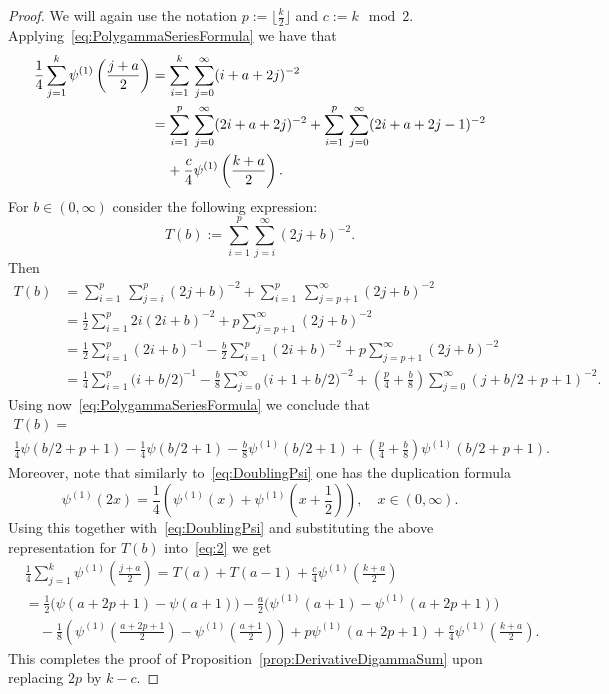 \documentclass[10pt]{amsart}
\theoremstyle{definition}\newtheorem{defi}[theo]{Definition}\newtheorem{rema}[theo]{Remark}\newtheorem{exam}[theo]{Example}\newtheorem{exem}[theo]{Example}\newtheorem{nota}[theo]{Notation}
\begin{document}
\begin{proof}
We will again use the notation $p:=\lfloor\frac{k}{2}\rfloor$ and $c:= k\mod 2$. Applying~\eqref{eq:PolygammaSeriesFormula} we have that
\begin{equation}\label{eq:2}
\begin{aligned}
\frac14\sum\limits_{j=1}^k\psi^{(1)}\left(\frac{j+a}{2}\right)&=\sum\limits_{i=1}^k\,\sum\limits_{j=0}^{\infty}(i+a+2j)^{-2}\\
&=\sum\limits_{i=1}^p\,\sum\limits_{j=0}^{\infty}(2i+a+2j)^{-2}+\sum\limits_{i=1}^p\,\sum\limits_{j=0}^{\infty}(2i+a+2j-1)^{-2}\\
&\mkern20mu +\frac{c}{4}\psi^{(1)}\left(\frac{k+a}{2}\right).
\end{aligned}
\end{equation}
For $b\in(0,\infty)$ consider the following expression:
\[
T(b):=\sum\limits_{i=1}^p\sum\limits_{j=i}^{\infty}(2j+b)^{-2}.
\]
Then
\begin{align*}
T(b)&=\sum\limits_{i=1}^p\,\sum\limits_{j=i}^{p}(2j+b)^{-2}+\sum\limits_{i=1}^p\,\sum\limits_{j=p+1}^{\infty}(2j+b)^{-2}\\
&=\frac12\sum\limits_{i=1}^p 2i(2i+b)^{-2}+p\sum\limits_{j=p+1}^{\infty}(2j+b)^{-2}\\
&=\frac12\sum\limits_{i=1}^p(2i+b)^{-1}-\frac{b}{2}\sum\limits_{i=1}^p(2i+b)^{-2}+p\sum\limits_{j=p+1}^{\infty}(2j+b)^{-2}\\
&=\frac14\sum\limits_{i=1}^p\big(i+b/2\big)^{-1}-\frac{b}{8}\sum\limits_{j=0}^\infty\big(i+1+b/2\big)^{-2}+\left(\frac{p}{4}+\frac{b}{8}\right)\sum\limits_{j=0}^{\infty}\left(j+b/2+p+1\right)^{-2}.
\end{align*}
Using now~\eqref{eq:PolygammaSeriesFormula} we conclude that
\begin{multline*}
T(b) =\\
\frac{1}{4}\psi(b/2+p+1)-\frac{1}{4}\psi(b/2+1)-\frac{b}{8}\psi^{(1)}(b/2+1)+\left(\frac{p}{4}+\frac{b}{8}\right)\psi^{(1)}\left(b/2+p+1\right).
\end{multline*}
Moreover, note that similarly to~\eqref{eq:DoublingPsi} one has the duplication formula
\[
\psi^{(1)}(2x) = \frac{1}{4}\left(\psi^{(1)}(x)+\psi^{(1)}\left(x+\frac{1}{2}\right)\right),\quad x\in(0,\infty).
\]
Using this together with~\eqref{eq:DoublingPsi} and substituting the above representation for $T(b)$ into~\eqref{eq:2} we get
\begin{align*}
&\frac14\sum\limits_{j=1}^k\psi^{(1)}\left(\frac{j+a}{2}\right)=T(a)+T(a-1)+\frac{c}{4}\psi^{(1)}\left(\frac{k+a}{2}\right)\\
&=\frac{1}{2}\big(\psi(a+2p+1)-\psi(a+1)\big)-\frac{a}{2}\big(\psi^{(1)}(a+1)-\psi^{(1)}(a+2p+1)\big)\\
&\quad -\frac{1}{8}\left(\psi^{(1)}\left(\frac{a+2p+1}{2}\right)-\psi^{(1)}\left(\frac{a+1}{2}\right)\right)+p\psi^{(1)}(a+2p+1)+\frac{c}{4}\psi^{(1)}\left(\frac{k+a}{2}\right).
\end{align*}
This completes the proof of Proposition~\ref{prop:DerivativeDigammaSum} upon replacing $2p$ by $k-c$.
\end{proof}
\end{document}
